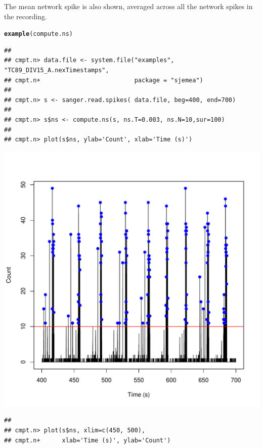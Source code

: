 \documentclass{article}\usepackage[]{graphicx}\usepackage[]{color}
\makeatletter
\def\maxwidth{ %
  \ifdim\Gin@nat@width>\linewidth
    \linewidth
  \else
    \Gin@nat@width
  \fi
}
\newcommand{\hlstd}[1]{\textcolor[rgb]{0.345,0.345,0.345}{#1}}%
\newcommand{\hlkwd}[1]{\textcolor[rgb]{0.737,0.353,0.396}{\textbf{#1}}}%
\newenvironment{kframe}{%
 \def\at@end@of@kframe{}%
 \ifinner\ifhmode%
  \def\at@end@of@kframe{\end{minipage}}%
  \begin{minipage}{\columnwidth}%
 \fi\fi%
 \def\FrameCommand##1{\hskip\@totalleftmargin \hskip-\fboxsep
 \colorbox{shadecolor}{##1}\hskip-\fboxsep
     \hskip-\linewidth \hskip-\@totalleftmargin \hskip\columnwidth}%
 \MakeFramed {\advance\hsize-\width
   \@totalleftmargin\z@ \linewidth\hsize
   \@setminipage}}%
 {\par\unskip\endMakeFramed%
 \at@end@of@kframe}
\newenvironment{knitrout}{}{} %
\makeatother
\begin{document}
The mean network spike is also shown, averaged across all the network
spikes in the recording.

\begin{knitrout}
\color{fgcolor}\begin{kframe}
\begin{alltt}
\hlkwd{example}\hlstd{(compute.ns)}
\end{alltt}
\begin{verbatim}
## 
## cmpt.n> data.file <- system.file("examples", "TC89_DIV15_A.nexTimestamps",
## cmpt.n+                          package = "sjemea")
## 
## cmpt.n> s <- sanger.read.spikes( data.file, beg=400, end=700)
## 
## cmpt.n> s$ns <- compute.ns(s, ns.T=0.003, ns.N=10,sur=100)
## 
## cmpt.n> plot(s$ns, ylab='Count', xlab='Time (s)')
\end{verbatim}
\end{kframe}
\includegraphics[width=\maxwidth]{figure/unnamed-chunk-11} 
\begin{kframe}\begin{verbatim}
## 
## cmpt.n> plot(s$ns, xlim=c(450, 500),
## cmpt.n+      xlab='Time (s)', ylab='Count')
\end{verbatim}
\end{kframe}

\end{knitrout}
\end{document}
